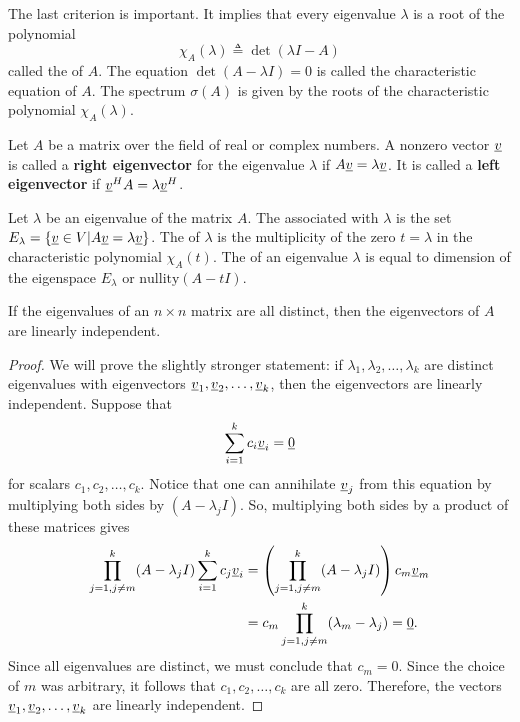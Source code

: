 The last criterion is important.
It implies that every eigenvalue $\lambda$ is a root of the polynomial 
\[ \chi_A (\lambda) \triangleq \det (\lambda I - A) \]
called the  of $A$.
The equation $\det (A - \lambda I) = 0$ is called the characteristic equation of $A$.
The spectrum $\sigma(A)$ is given by the roots of the characteristic polynomial $\chi_A (\lambda)$.

Let $A$ be a matrix over the field of real or complex numbers.
A nonzero vector $\underline{v}$ is called a \textbf{right eigenvector} for the eigenvalue $\lambda$ if $A \underline{v} = \lambda \underline{v}$.
It is called a \textbf{left eigenvector} if $\underline{v}^H A = \lambda \underline{v}^H$.

\begin{definition}
Let $\lambda$ be an eigenvalue of the matrix $A$.
The  associated with $\lambda$ is the set $E_\lambda = \{ \underline{v} \in V | A \underline{v} = \lambda \underline{v} \}$.
The  of $\lambda$ is the multiplicity of the zero $t=\lambda$ in the characteristic polynomial $\chi_A (t)$.
The  of an eigenvalue $\lambda$ is equal to dimension of the eigenspace $E_\lambda$ or $\textrm{nullity}(A - t I)$.
\end{definition}

\begin{theorem}
If the eigenvalues of an $n \times n$ matrix are all distinct, then the eigenvectors of $A$ are linearly independent.
\end{theorem}
\begin{proof}
We will prove the slightly stronger statement: if $\lambda_1 , \lambda_2 , \ldots, \lambda_k $ are distinct eigenvalues with eigenvectors $\underline{v}_1 , \underline{v}_2 , \ldots, \underline{v}_k$, then the eigenvectors are linearly independent.
Suppose that
\begin{equation*}
\sum_{i=1}^k c_i \underline{v}_i = \underline{0}
\end{equation*}
for scalars $c_1, c_2, \ldots, c_k$.
Notice that one can annihilate $\underline{v}_j$ from this equation by multiplying both sides by $(A-\lambda_j I)$.
So, multiplying both sides by a product of these matrices gives
\begin{align*}
\prod_{j=1,j\neq m}^k (A-\lambda_j I) \sum_{i=1}^k c_j \underline{v}_i
&= \left( \prod_{j=1,j\neq m}^k (A-\lambda_j I) \right) c_m \underline{v}_m \\
&= c_m \prod_{j=1,j\neq m}^k (\lambda_m - \lambda_j) = \underline{0}.
\end{align*}
Since all eigenvalues are distinct, we must conclude that $c_m = 0$.
Since the choice of $m$ was arbitrary, it follows that $c_1,c_2,\ldots,c_k$ are all zero.
Therefore, the vectors $\underline{v}_1 , \underline{v}_2 , \ldots, \underline{v}_k$ are linearly independent.
\end{proof}

